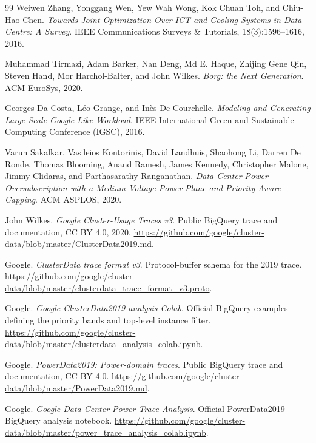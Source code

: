 ﻿\documentclass[12pt]{article}
\begin{document}
\begin{thebibliography}{99}
Weiwen Zhang, Yonggang Wen, Yew Wah Wong, Kok Chuan Toh, and Chiu-Hao Chen.
\newblock \emph{Towards Joint Optimization Over ICT and Cooling Systems in Data
Centre: A Survey}.
\newblock IEEE Communications Surveys \& Tutorials, 18(3):1596--1616, 2016.

Muhammad Tirmazi, Adam Barker, Nan Deng, Md E. Haque, Zhijing Gene Qin, Steven
Hand, Mor Harchol-Balter, and John Wilkes.
\newblock \emph{Borg: the Next Generation}.
\newblock ACM EuroSys, 2020.

Georges Da Costa, L\'{e}o Grange, and In\`{e}s De Courchelle.
\newblock \emph{Modeling and Generating Large-Scale Google-Like Workload}.
\newblock IEEE International Green and Sustainable Computing Conference (IGSC),
2016.

Varun Sakalkar, Vasileios Kontorinis, David Landhuis, Shaohong Li, Darren De
Ronde, Thomas Blooming, Anand Ramesh, James Kennedy, Christopher Malone, Jimmy
Clidaras, and Parthasarathy Ranganathan.
\newblock \emph{Data Center Power Oversubscription with a Medium Voltage Power
Plane and Priority-Aware Capping}.
\newblock ACM ASPLOS, 2020.

John Wilkes.
\newblock \emph{Google Cluster-Usage Traces v3}.
\newblock Public BigQuery trace and documentation, CC BY 4.0, 2020.
\newblock \url{https://github.com/google/cluster-data/blob/master/ClusterData2019.md}.

Google.
\newblock \emph{ClusterData trace format v3}.
\newblock Protocol-buffer schema for the 2019 trace.
\newblock \url{https://github.com/google/cluster-data/blob/master/clusterdata_trace_format_v3.proto}.

Google.
\newblock \emph{Google ClusterData2019 analysis Colab}.
\newblock Official BigQuery examples defining the priority bands and top-level
instance filter.
\newblock \url{https://github.com/google/cluster-data/blob/master/clusterdata_analysis_colab.ipynb}.

Google.
\newblock \emph{PowerData2019: Power-domain traces}.
\newblock Public BigQuery trace and documentation, CC BY 4.0.
\newblock \url{https://github.com/google/cluster-data/blob/master/PowerData2019.md}.

Google.
\newblock \emph{Google Data Center Power Trace Analysis}.
\newblock Official PowerData2019 BigQuery analysis notebook.
\newblock \url{https://github.com/google/cluster-data/blob/master/power_trace_analysis_colab.ipynb}.


\end{thebibliography}
\end{document}
